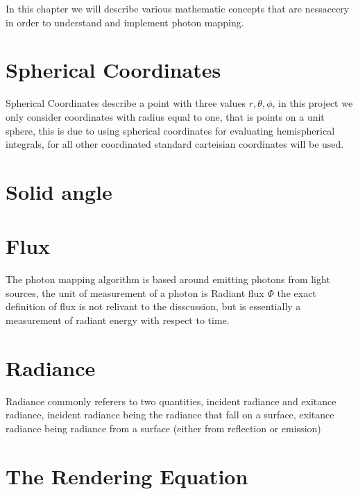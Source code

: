 In this chapter we will describe various mathematic concepts that are nessaccery in order to understand and implement photon mapping.

\section{Spherical Coordinates}
Spherical Coordinates describe a point with three values $r, \theta, \phi$, in this project we only consider coordinates with
radius equal to one, that is points on a unit sphere, this is due to using spherical coordinates for evaluating hemispherical
integrals, for all other coordinated standard carteisian coordinates will be used.


\section{Solid angle}

\section{Flux}
The photon mapping algorithm is based around emitting photons from light sources, the unit of measurement of a photon is
Radiant flux $\Phi$ the exact definition of flux is not relivant to the disscussion, but is essentially a measurement
of radiant energy with respect to time. 

\section{Radiance}
Radiance commonly referers to two quantities, incident radiance and exitance radiance, incident radiance being the radiance
that fall on a surface, exitance radiance being radiance from a surface (either from reflection or emission)

\section{The Rendering Equation}

